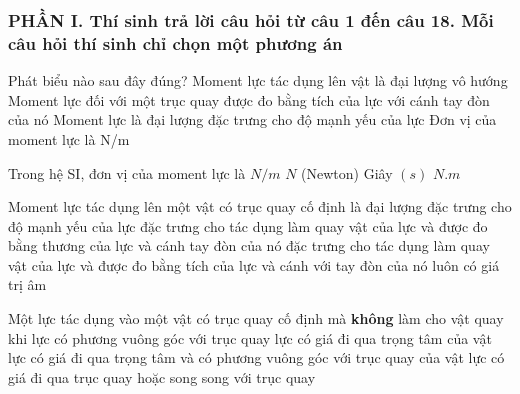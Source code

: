 \subsubsection*{PHẦN I. Thí sinh trả lời câu hỏi từ câu 1 đến câu 18. Mỗi câu hỏi thí sinh chỉ chọn một phương án}
\setcounter{ex}{0}
\begin{ex}%
Phát biểu nào sau đây đúng?
\choice
{Moment lực tác dụng lên vật là đại lượng vô hướng}
{\True Moment lực đối với một trục quay được đo bằng tích của lực với cánh tay đòn của nó}
{Moment lực là đại lượng đặc trưng cho độ mạnh yếu của lực}
{Đơn vị của moment lực là N/m}
\end{ex}
\begin{ex}%
Trong hệ SI, đơn vị của moment lực là
\choice
{$N/m$}
{$N$ (Newton)}
{Giây $(s)$}
{\True $N.m$}
\end{ex}
\begin{ex}%
Moment lực tác dụng lên một vật có trục quay cố định là đại lượng 
\choice
{đặc trưng cho độ mạnh yếu của lực}
{đặc trưng cho tác dụng làm quay vật của lực và được đo bằng thương của lực và cánh  tay đòn của nó}
{\True đặc trưng cho tác dụng làm quay vật của lực và được đo bằng tích của lực và cánh với tay đòn của nó}
{luôn có giá trị âm} 
\end{ex}
\begin{ex}%
Một lực tác dụng vào một vật có trục quay cố định mà \textbf{không} làm cho vật quay khi
\choice
{lực có phương vuông góc với trục quay}
{lực có giá đi qua trọng tâm của vật}
{lực có giá đi qua trọng tâm và có phương vuông góc với trục quay của vật}
{\True lực có giá đi qua trục quay hoặc song song với trục quay}
\end{ex}
